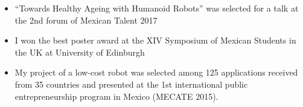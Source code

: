 \documentclass{mycv}
\begin{document}
\begin{itemize}
\item ``Towards Healthy Ageing with Humanoid Robots'' was selected for a talk at the 2nd forum of Mexican Talent 2017 \href{https://github.com/mxochicale/InnovationMatchMX/tree/master/2017}{\faExternalLink*} \href{https://github.com/mxochicale/InnovationMatchMX/blob/master/2017/presentation/IMMX-MA-0058.pdf}{\faFilePdf} \href{https://www.youtube.com/watch?v=wNWzpdXdm5U}{\faYoutube} 

\item I won the best poster award at the XIV Symposium of Mexican Students in the UK at University of Edinburgh \href{https://github.com/mxochicale/symposiummx/tree/master/2016}{\faExternalLink*} 

\item My project of a low-cost robot was selected among 125 applications received from 35 countries and presented at the 1st international public entrepreneurship program in Mexico (MECATE 2015). \href{http://let-emprendimientopublico.mx/en/portfolio_category/mecate-primera-generacion-en/}{\faExternalLink*} \href{https://www.youtube.com/watch?v=VjVGnwD422g}{\faYoutube} 



\end{itemize}

\end{document}
